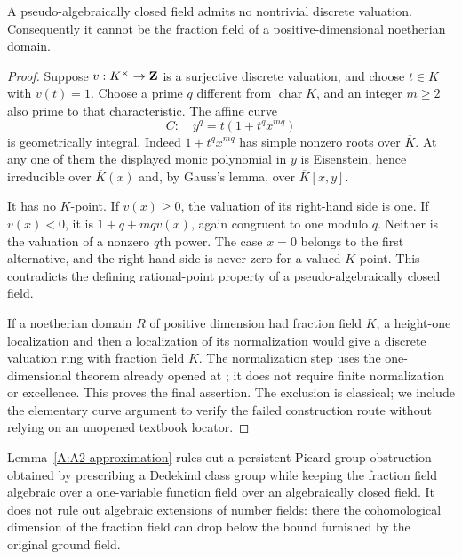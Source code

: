\begin{lemma}
\label{A:A2-PAC-exclusion}
A pseudo-algebraically closed field admits no nontrivial discrete
valuation. Consequently it cannot be the fraction field of a
positive-dimensional noetherian domain.
\end{lemma}
\begin{proof}
Suppose $v:K^\times\to\mathbf Z$ is a surjective discrete valuation, and
choose $t\in K$ with $v(t)=1$. Choose a prime $q$ different from
$\operatorname{char}K$, and an integer $m\geq2$ also prime to that
characteristic. The affine curve
\[
 C:\quad y^q=t(1+t^q x^{mq})
\]
is geometrically integral. Indeed $1+t^q x^{mq}$ has simple nonzero
roots over $\overline K$. At any one of them the displayed monic
polynomial in $y$ is Eisenstein, hence irreducible over
$\overline K(x)$ and, by Gauss's lemma, over $\overline K[x,y]$.

It has no $K$-point. If $v(x)\geq0$, the valuation of its right-hand
side is one. If $v(x)<0$, it is
$1+q+mqv(x)$, again congruent to one modulo $q$. Neither is the
valuation of a nonzero $q$th power. The case $x=0$ belongs to the
first alternative, and the right-hand side is never zero for a
valued $K$-point. This contradicts the defining rational-point
property of a pseudo-algebraically closed field.

If a noetherian domain $R$ of positive dimension had fraction field
$K$, a height-one localization and then a localization of its
normalization would give a discrete valuation ring with fraction
field $K$. The normalization step uses the one-dimensional theorem
already opened at \citet[Tag 09IG, Lemma 10.120.18]{A_Stacks}; it
does not require finite normalization or excellence. This proves
the final assertion. The exclusion is classical; we include the
elementary curve argument to verify the failed construction route
without relying on an unopened textbook locator.
\end{proof}

Lemma~\ref{A:A2-approximation} rules out a persistent Picard-group obstruction obtained by
prescribing a Dedekind class group while keeping the fraction field
algebraic over a one-variable function field over an algebraically
closed field.  It does not rule out algebraic extensions of number
fields: there the cohomological dimension of the fraction field can
drop below the bound furnished by the original ground field.

